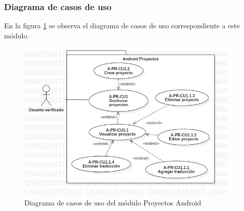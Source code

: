 \subsubsection{Diagrama de casos de uso}
En la figura \ref{fig:modulo-proyectos-android} se observa el diagrama de casos de uso correspondiente a este módulo.
\begin{figure}[H]
    \centering
    \includegraphics[width=400px]{capitulo4/android/modulo-proyectos-android.jpg}
    \caption{Diagrama de casos de uso del módulo Proyectos Android}
    \label{fig:modulo-proyectos-android}
\end{figure}

\newpage

\newpage

\newpage

\newpage

\newpage
%
\newpage

